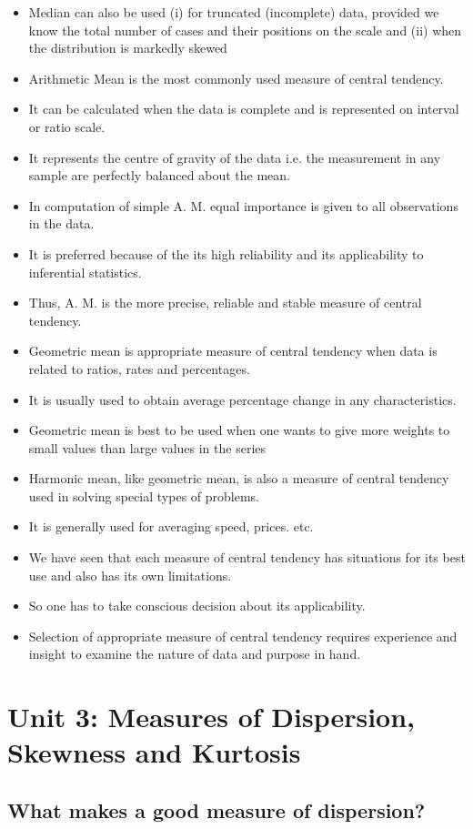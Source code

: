 \documentclass[
10pt, %
a4paper, %
]{report}
\begin{document}
\begin{itemize}
\item Median can also be used (i) for truncated (incomplete) data, provided we know the total number of cases and their positions on the scale and (ii) when the distribution is markedly skewed
\item Arithmetic Mean is the most commonly used measure of central tendency.
\item It can be calculated when the data is complete and is represented on interval or ratio scale.
\item It represents the centre of gravity of the data i.e. the measurement in any sample are perfectly balanced about the mean.
\item In computation of simple A. M. equal importance is given to all observations in the data.
\item It is preferred because of the its high reliability and its applicability to inferential statistics.
\item Thus, A. M. is the more precise, reliable and stable measure of central tendency.
\item Geometric mean is appropriate measure of central tendency when data is related to ratios, rates and percentages.
\item It is usually used to obtain average percentage change in any characteristics.
\item Geometric mean is best to be used when one wants to give more weights to small values than large values in the series
\item Harmonic mean, like geometric mean, is also a measure of central tendency used in solving special types of problems.
\item It is generally used for averaging speed, prices. etc.
\item We have seen that each measure of central tendency has situations for its best use and also has its own limitations.
\item So one has to take conscious decision about its applicability.
\item Selection of appropriate measure of central tendency requires experience and insight to examine the nature of data and purpose in hand.
\end{itemize}

\chapter{Unit 3: Measures of Dispersion, Skewness and Kurtosis}

\section{What makes a good measure of dispersion?}
\end{document}
